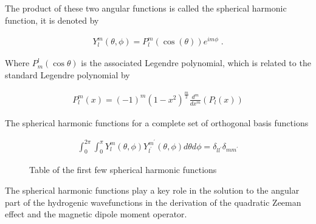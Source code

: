         \noindent The product of these two angular functions is called the spherical harmonic function, it is denoted by 

        \begin{align}
            Y^m_l (\theta, \phi) = P^m_l(\cos(\theta)) e^{im\phi}\;.
        \end{align}

        \noindent Where $P^l_m(\cos \theta)$ is the associated Legendre polynomial, which is related to the standard Legendre polynomial by 

        \begin{align}
            P^m_l(x) = (-1)^m (1-x^2)^{\frac{m}{2}} \frac{d^m}{dx^m} \left(P_l(x) \right)
        \end{align}

        The spherical harmonic functions for a complete set of orthogonal basis functions 

        \begin{align}
            \int_0^{2\pi} \int_0^\pi Y^m_l(\theta, \phi) Y^{m^\prime}_{l^\prime}(\theta, \phi) d\theta d\phi = \delta_{ll^\prime}\delta_{mm^\prime}
        \end{align}

        \begin{figure}[h]
            \centering 
            \caption{Table of the first few spherical harmonic functions}
            \label{tab:spherical_harmonic}
        \end{figure}

        \noindent The spherical harmonic functions play a key role in the solution to the angular part of the hydrogenic wavefunctions in the derivation of the quadratic Zeeman effect and the magnetic dipole moment operator.

